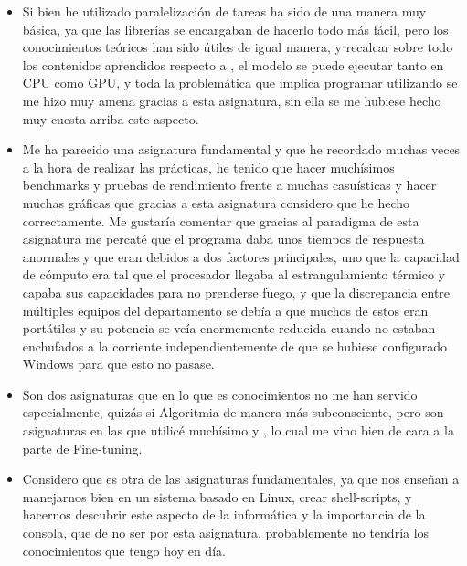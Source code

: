 \begin{itemize}
    \item {} Si bien he utilizado paralelización de tareas ha sido de una manera muy básica, ya que las librerías se encargaban de hacerlo todo más fácil, pero los conocimientos teóricos han sido útiles de igual manera, y recalcar sobre todo los contenidos aprendidos respecto a 
    \href{https://es.wikipedia.org/wiki/CUDA}{}, el modelo \href{https://en.wikipedia.org/wiki/Large_language_model}{} se puede ejecutar tanto en CPU como GPU, y toda la problemática que implica programar utilizando 
    \href{https://es.wikipedia.org/wiki/CUDA}{} se me hizo muy amena gracias a esta asignatura, sin ella se me hubiese hecho muy cuesta arriba este aspecto.
    \newpage
    \item {} Me ha parecido una asignatura fundamental y que he recordado muchas veces a la hora de realizar las prácticas, he tenido que hacer muchísimos benchmarks y pruebas de rendimiento frente a muchas casuísticas y hacer muchas gráficas que gracias a esta asignatura considero que he hecho correctamente. Me gustaría comentar que gracias al paradigma de esta asignatura me percaté que el programa daba unos tiempos de respuesta anormales y que eran debidos a dos factores principales, uno que la capacidad de cómputo era tal que el procesador llegaba al estrangulamiento térmico y capaba sus capacidades para no prenderse fuego, y que la discrepancia entre múltiples equipos del departamento se debía a que muchos de estos eran portátiles y su potencia se veía enormemente reducida cuando no estaban enchufados a la corriente independientemente de que se hubiese configurado Windows para que esto no pasase.
    \item {} Son dos asignaturas que en lo que es conocimientos no me han servido especialmente, quizás si Algoritmia de manera más subconsciente, pero son asignaturas en las que utilicé muchísimo \href{https://en.wikipedia.org/wiki/C_(programming_language)}{} y \href{https://en.wikipedia.org/wiki/C%2B%2B}{\bold{C++}}, lo cual me vino bien de cara a la parte de Fine-tuning.
    \item {} Considero que es otra de las asignaturas fundamentales, ya que nos enseñan a manejarnos bien en un sistema basado en Linux, crear shell-scripts, y hacernos descubrir este aspecto de la informática y la importancia de la consola, que de no ser por esta asignatura, probablemente no tendría los conocimientos que tengo hoy en día. 
\end{itemize}